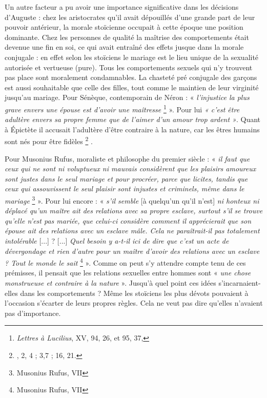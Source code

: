  Un autre facteur a pu avoir une importance significative dans les décisions d'Auguste : chez les aristocrates qu'il avait dépouillés d'une grande part de leur pouvoir antérieur, la morale stoïcienne occupait à cette époque une position dominante. Chez les personnes de qualité la maîtrise des comportements était devenue une fin en soi, ce qui avait entraîné des effets jusque dans la morale conjugale : en effet selon les stoïciens le mariage est le lieu unique de la sexualité autorisée et vertueuse (pure). Tous les comportements sexuels qui n'y trouvent pas place sont moralement condamnables. La chasteté pré conjugale des garçons est aussi souhaitable que celle des filles, tout comme le maintien de leur virginité jusqu'au mariage. Pour Sénèque, contemporain de Néron : « \emph{l'injustice la plus grave envers une épouse est d'avoir une maîtresse}%
\footnote{\emph{Lettres à Lucilius}, XV, 94, 26, et 95, 37, }
». Pour lui \emph{« c'est être adultère envers sa propre femme que de l'aimer d'un amour trop ardent »}. Quant à Épictète il accusait l'adultère d'être contraire à la nature, car les êtres humains sont nés pour être fidèles%
\footnote{, 2, 4 ; 3,7 ; 16, 21.}%
. 

 Pour Musonius Rufus, moraliste et philosophe du premier siècle : « \emph{il faut que ceux qui ne sont ni voluptueux ni mauvais considèrent que les plaisirs amoureux sont justes dans le seul mariage et pour procréer, parce que licites, tandis que ceux qui assouvissent le seul plaisir sont injustes et criminels, même dans le mariage}%
\footnote{Musonius Rufus, VII}
». Pour lui encore : « \emph{s'il semble} [à quelqu'un qu'il n'est] \emph{ni honteux ni déplacé qu'un maître ait des relations avec sa propre esclave, surtout s'il se trouve qu'elle n'est pas mariée, que celui-ci considère comment il apprécierait que son épouse ait des relations avec un esclave mâle. Cela ne paraîtrait-il pas totalement intolérable} [...] ? [...] \emph{Quel besoin y a-t-il ici de dire que c'est un acte de dévergondage et rien d'autre pour un maître d'avoir des relations avec un esclave ? Tout le monde le sait}%
\footnote{Musonius Rufus, VII}
». Comme on peut s'y attendre compte tenu de ces prémisses, il pensait que les relations sexuelles entre hommes sont « \emph{une chose monstrueuse et contraire à la nature} ». Jusqu'à quel point ces idées s'incarnaient-elles dans les comportements ? Même les stoïciens les plus dévots pouvaient à l'occasion s'écarter de leurs propres règles. Cela ne veut pas dire qu'elles n'avaient pas d'importance. 

